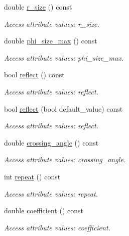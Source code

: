 \begin{DoxyCompactItemize}
double \hyperlink{struct_d_d4hep_1_1_x_m_l_1_1_dimension_ab005207c99a52f50be30c66e733cbec5}{r\+\_\+size} () const
\begin{DoxyCompactList}\small\item\em Access attribute values\+: r\+\_\+size. \end{DoxyCompactList}\item 
double \hyperlink{struct_d_d4hep_1_1_x_m_l_1_1_dimension_a6be32d05b445cddc97d91a0eb2cdff05}{phi\+\_\+size\+\_\+max} () const
\begin{DoxyCompactList}\small\item\em Access attribute values\+: phi\+\_\+size\+\_\+max. \end{DoxyCompactList}\item 
bool \hyperlink{struct_d_d4hep_1_1_x_m_l_1_1_dimension_a4e98c1133276f1ef0e555493b0031206}{reflect} () const
\begin{DoxyCompactList}\small\item\em Access attribute values\+: reflect. \end{DoxyCompactList}\item 
bool \hyperlink{struct_d_d4hep_1_1_x_m_l_1_1_dimension_a69f28e5a5c066527b922577e8ae269bd}{reflect} (bool default\+\_\+value) const
\begin{DoxyCompactList}\small\item\em Access attribute values\+: reflect. \end{DoxyCompactList}\item 
double \hyperlink{struct_d_d4hep_1_1_x_m_l_1_1_dimension_aa69247b85a005c0dbfa5069b3e69862e}{crossing\+\_\+angle} () const
\begin{DoxyCompactList}\small\item\em Access attribute values\+: crossing\+\_\+angle. \end{DoxyCompactList}\item 
int \hyperlink{struct_d_d4hep_1_1_x_m_l_1_1_dimension_ab612ed41a49b8bbddd85cebbebeaa79f}{repeat} () const
\begin{DoxyCompactList}\small\item\em Access attribute values\+: repeat. \end{DoxyCompactList}\item 
double \hyperlink{struct_d_d4hep_1_1_x_m_l_1_1_dimension_ace7fb136968f4abdde87b86c8f8da72b}{coefficient} () const
\begin{DoxyCompactList}\small\item\em Access attribute values\+: coefficient. \end{DoxyCompactList}\item 

\end{DoxyCompactItemize}
